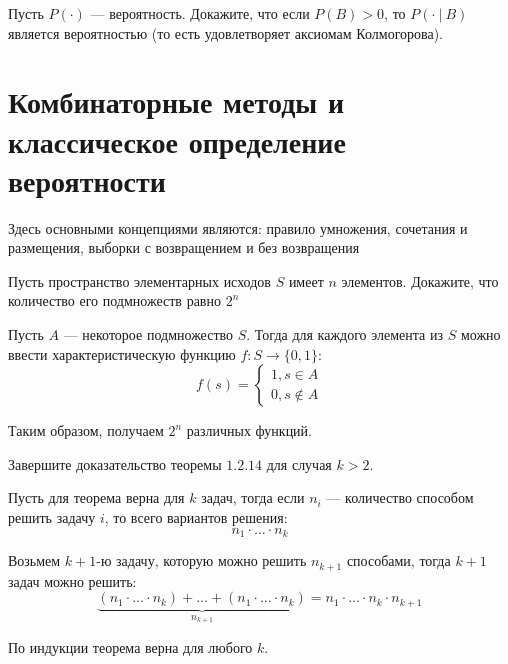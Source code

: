 \documentclass[document]{subfiles}
\begin{document}
\begin{problem}
Пусть $P(\cdot)$ --- вероятность. Докажите, что если ${P(B) > 0}$, то ${P(\cdot ~|~ B)}$ является вероятностью (то есть удовлетворяет аксиомам Колмогорова).
\end{problem}
\begin{solution}
    
\end{solution}

\section{Комбинаторные методы и классическое определение вероятности}

Здесь основными концепциями являются: правило умножения, сочетания и размещения, выборки с возвращением и без возвращения

\begin{problem}
    Пусть пространство элементарных исходов $S$ имеет $n$ элементов. Докажите, что количество его подмножеств равно $2^n$
\end{problem}
\begin{solution}
Пусть $A$ --- некоторое подмножество $S$. Тогда для каждого элемента из $S$ можно ввести характеристическую функцию ${f: S \to \{0, 1\}}$:
    \[f(s) = \begin{cases}1, s \in A \\ 0, s \not \in A \end{cases}\]

    Таким образом, получаем $2^n$ различных функций.
\end{solution}

\begin{problem}
    Завершите доказательство теоремы $1.2.14$ для случая $k > 2$.
\end{problem}
\begin{solution}
    Пусть для теорема верна для $k$ задач, тогда если $n_i$ --- количество способом решить задачу $i$, то всего вариантов решения:
    \[n_1 \cdot \dots \cdot n_k\]

    Возьмем $k+1$-ю задачу, которую можно решить $n_{k+1}$ способами, тогда $k+1$ задач можно решить:
    \[\underbrace{(n_1 \cdot \dots \cdot n_k) + \dots + (n_1 \cdot \dots \cdot n_k)}_{n_{k+1}} = n_1 \cdot \dots \cdot n_k \cdot n_{k+1}\]

    По индукции теорема верна для любого $k$.
\end{solution}
\end{document}

